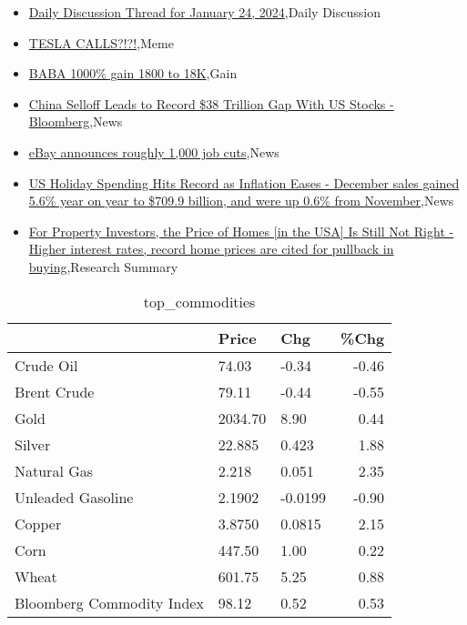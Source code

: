 \documentclass{article}%
\begin{document}
%
\begin{itemize}%
\item%
\href{https://reddit.com/r/wallstreetbets/comments/19eejca/daily\_discussion\_thread\_for\_january\_24\_2024/}{Daily Discussion Thread for January 24, 2024},Daily Discussion%
\item%
\href{https://reddit.com/r/wallstreetbets/comments/19ec4mf/tesla\_calls/}{TESLA CALLS?!?!},Meme%
\item%
\href{https://reddit.com/r/wallstreetbets/comments/19ebfyq/baba\_1000\_gain\_1800\_to\_18k/}{BABA 1000\% gain 1800 to 18K},Gain%
\item%
\href{https://reddit.com/r/Economics/comments/19e72k3/china\_selloff\_leads\_to\_record\_38\_trillion\_gap/}{China Selloff Leads to Record \$38 Trillion Gap With US Stocks - Bloomberg},News%
\item%
\href{https://reddit.com/r/Economics/comments/19e5ooq/ebay\_announces\_roughly\_1000\_job\_cuts/}{eBay announces roughly 1,000 job cuts},News%
\item%
\href{https://reddit.com/r/Economics/comments/19e1c2p/us\_holiday\_spending\_hits\_record\_as\_inflation/}{US Holiday Spending Hits Record as Inflation Eases - December sales gained 5.6\% year on year to \$709.9 billion, and were up 0.6\% from November},News%
\item%
\href{https://reddit.com/r/Economics/comments/19e06mv/for\_property\_investors\_the\_price\_of\_homes\_in\_the/}{For Property Investors, the Price of Homes [in the USA] Is Still Not Right - Higher interest rates, record home prices are cited for pullback in buying},Research Summary%
\end{itemize}%


\begin{table}[htbp]%
\caption{top\_commodities}%
\centering%
\begin{adjustbox}{width=1\textwidth}%
\begin{tabular}{lllr}
\toprule
                          &   Price &     Chg &  \%Chg \\
\midrule
               Crude Oil  &   74.03 &   -0.34 & -0.46 \\
             Brent Crude  &   79.11 &   -0.44 & -0.55 \\
                    Gold  & 2034.70 &    8.90 &  0.44 \\
                  Silver  &  22.885 &   0.423 &  1.88 \\
             Natural Gas  &   2.218 &   0.051 &  2.35 \\
       Unleaded Gasoline  &  2.1902 & -0.0199 & -0.90 \\
                  Copper  &  3.8750 &  0.0815 &  2.15 \\
                    Corn  &  447.50 &    1.00 &  0.22 \\
                   Wheat  &  601.75 &    5.25 &  0.88 \\
Bloomberg Commodity Index &   98.12 &    0.52 &  0.53 \\
\bottomrule
\end{tabular}
%
\end{adjustbox}%
\end{table}
\end{document}
